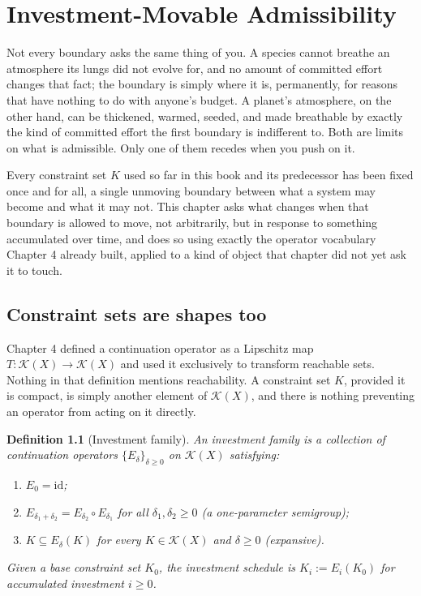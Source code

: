 \documentclass[11pt]{report}
\newtheorem{definition}{Definition}[chapter]
\begin{document}
\chapter{Investment-Movable Admissibility}

Not every boundary asks the same thing of you. A species cannot
breathe an atmosphere its lungs did not evolve for, and no amount of
committed effort changes that fact; the boundary is simply where it
is, permanently, for reasons that have nothing to do with anyone's
budget. A planet's atmosphere, on the other hand, can be thickened,
warmed, seeded, and made breathable by exactly the kind of committed
effort the first boundary is indifferent to. Both are limits on what
is admissible. Only one of them recedes when you push on it.

Every constraint set $K$ used so far in this book and its predecessor
has been fixed once and for all, a single unmoving boundary between
what a system may become and what it may not. This chapter asks what
changes when that boundary is allowed to move, not arbitrarily, but in
response to something accumulated over time, and does so using
exactly the operator vocabulary Chapter 4 already built, applied to a
kind of object that chapter did not yet ask it to touch.

\section*{Constraint sets are shapes too}

Chapter 4 defined a continuation operator as a Lipschitz map $T :
\mathcal{K}(X) \to \mathcal{K}(X)$ and used it exclusively to
transform reachable sets. Nothing in that definition mentions
reachability. A constraint set $K$, provided it is compact, is simply
another element of $\mathcal{K}(X)$, and there is nothing preventing
an operator from acting on it directly.

\begin{definition}[Investment family]
An investment family is a collection of continuation operators
$\{E_\delta\}_{\delta \geq 0}$ on $\mathcal{K}(X)$ satisfying:
\begin{enumerate}[label=(\roman*)]
\item $E_0 = \mathrm{id}$;
\item $E_{\delta_1 + \delta_2} = E_{\delta_2} \circ E_{\delta_1}$ for
all $\delta_1, \delta_2 \geq 0$ (a one-parameter semigroup);
\item $K \subseteq E_\delta(K)$ for every $K \in \mathcal{K}(X)$ and
$\delta \geq 0$ (expansive).
\end{enumerate}
Given a base constraint set $K_0$, the investment schedule is $K_i :=
E_i(K_0)$ for accumulated investment $i \geq 0$.
\end{definition}
\end{document}
